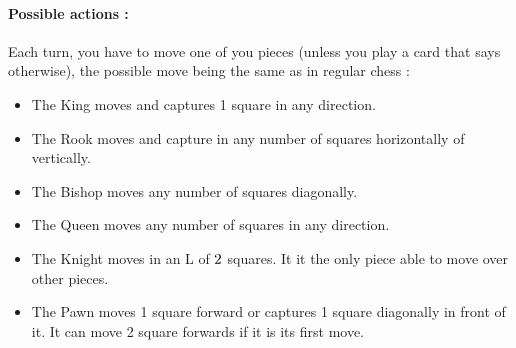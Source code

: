 \documentclass[12pt]{article}
\begin{document}
            \paragraph{Possible actions :\\}
                Each turn, you have to move one of you pieces (unless you play a card that says otherwise), the possible move being the same as in regular chess :
                \begin{itemize}
                    \item The King moves and captures 1 square in any direction.
                    \begin{figure}[H]
                        \centering
                        \scalebox{0.5}{\showboard}
                    \end{figure}
                    \item The Rook moves and capture in any number of squares horizontally of vertically.
                    \begin{figure}[H]
                        \centering
                        \scalebox{0.5}{\showboard}
                    \end{figure}
                    \item The Bishop moves any number of squares diagonally.
                    \begin{figure}[H]
                        \centering
                        \scalebox{0.5}{\showboard}
                    \end{figure}
                    \item The Queen moves any number of squares in any direction.
                    \begin{figure}[H]
                        \centering
                        \scalebox{0.5}{\showboard}
                    \end{figure}
                    \item The Knight moves in an L of $2\time3$ squares. It it the only piece able to move over other pieces.
                    \begin{figure}[H]
                        \centering
                        \scalebox{0.5}{\showboard}
                    \end{figure}
                    \item The Pawn moves 1 square forward or captures 1 square diagonally in front of it. It can move 2 square forwards if it is its first move.
                    \begin{figure}[H]
                        \centering
                        \scalebox{0.5}{\showboard}
                    \end{figure}
                \end{itemize}
                
\end{document}
